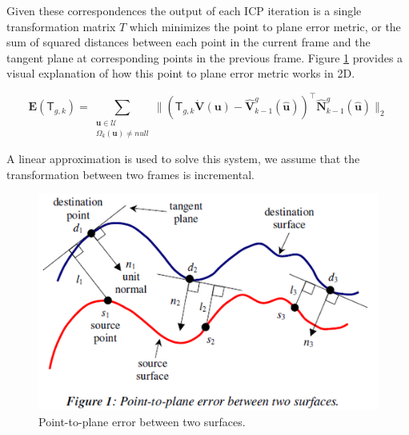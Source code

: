 \documentclass[10pt, twocolumn]{article}
\begin{document}
Given these correspondences the output of each ICP iteration is a single transformation matrix $T$ which minimizes the point to plane error metric, or the sum of squared distances between each point in the current frame and the tangent plane at corresponding points in the previous frame. Figure \ref{fig:pointplane} \cite{Low04linearleast-squares} provides a visual explanation of how this point to plane error metric works in 2D.

\begin{equation}
\mathbf{E}(\mathsf{T}_{g,k}) = 
\sum_{\substack{
   \mathbf{u} \in \mathcal{U} \\
   \Omega_{k}(\mathbf{u}) \neq null
  }}
  \| ( \mathsf{T}_{g,k} \mathbf{\dot{V}} (\mathbf{u}) - \mathbf{\hat{V}}^{g}_{k-1} (\mathbf{\hat{u}}))^{\top} \mathbf{\hat{N}}^{g}_{k-1} (\mathbf{\hat{u}}) \|_{2}
\end{equation}


A linear approximation is used to solve this system, we assume that the transformation between two frames is incremental.

\begin{figure}
  \centering
  \includegraphics[width=1.0\linewidth]{pointplane}
  \caption{Point-to-plane error between two surfaces.}
  \label{fig:pointplane}
\end{figure}
\end{document}
